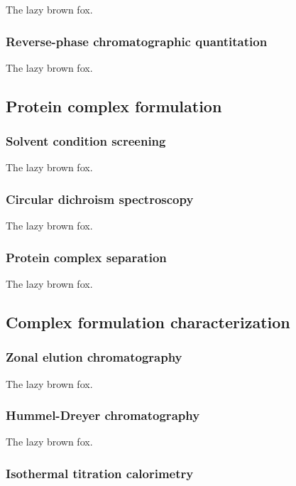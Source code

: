 \begin{refsection}
The lazy brown fox.

\subsubsection{Reverse-phase chromatographic quantitation}

The lazy brown fox.

\subsection{Protein complex formulation}

\subsubsection{Solvent condition screening}

The lazy brown fox.

\subsubsection{Circular dichroism spectroscopy}

The lazy brown fox.

\subsubsection{Protein complex separation}

The lazy brown fox.

\subsection{Complex formulation characterization}

\subsubsection{Zonal elution chromatography}

The lazy brown fox.

\subsubsection{Hummel-Dreyer chromatography}

The lazy brown fox.

\subsubsection{Isothermal titration calorimetry}


\end{refsection}
